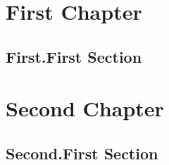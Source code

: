 \documentclass[12pt,twoside,draft]{tubsreprt}
\begin{document}
\sloppy
\chapter{First Chapter}
\lipsum[1]
\section{First.First Section}
\lipsum[2-25]
\chapter{Second Chapter}
\lipsum[26]
\section{Second.First Section}
\lipsum[27-40]
\end{document}
